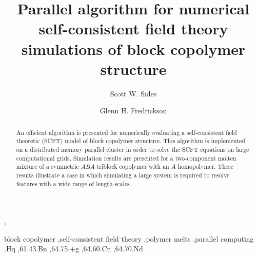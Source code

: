 \documentclass[onecolumn,amsmath,amssymb,floatfix]{elsart}
\begin{document}
\begin{frontmatter}


\title
{
Parallel algorithm for numerical self-consistent field theory
simulations of block copolymer structure
}



\author{Scott W. Sides},
\author{Glenn H. Fredrickson}




\address
{
University of California at Santa Barbara (UCSB)
Santa Barbara, CA 93106
}


\begin{abstract}

An efficient algorithm is presented for numerically evaluating a
self-consistent field theoretic (SCFT) model of block copolymer
structure.
This algorithm is implemented on a distributed memory
parallel cluster in order to solve the SCFT equations on large
computational grids.
Simulation results are presented for a
two-component molten mixture of a symmetric $ABA$ triblock
copolymer with an $A$ homopolymer.
These results illustrate
a case in which simulating a large system is required to resolve
features with a wide range of length-scales.

\end{abstract}

\begin{keyword}
block copolymer \sep self-consistent field theory \sep polymer melts \sep parallel computing
.Hq \sep 61.43.Bn \sep 64.75.+g \sep 64.60.Cn \sep 64.70.Nd
\end{keyword}





\end{frontmatter}
\end{document}
